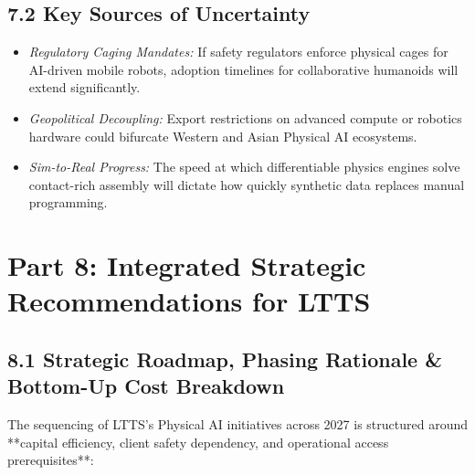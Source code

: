 \documentclass[11pt,a4paper]{article}
\begin{document}
\subsection{7.2 Key Sources of Uncertainty}
\begin{itemize}
    \item \textit{Regulatory Caging Mandates:} If safety regulators enforce physical cages for AI-driven mobile robots, adoption timelines for collaborative humanoids will extend significantly.
    \item \textit{Geopolitical Decoupling:} Export restrictions on advanced compute or robotics hardware could bifurcate Western and Asian Physical AI ecosystems.
    \item \textit{Sim-to-Real Progress:} The speed at which differentiable physics engines solve contact-rich assembly will dictate how quickly synthetic data replaces manual programming.
\end{itemize}

\section{Part 8: Integrated Strategic Recommendations for LTTS}

\subsection{8.1 Strategic Roadmap, Phasing Rationale \& Bottom-Up Cost Breakdown}
The sequencing of LTTS's Physical AI initiatives across 2027 is structured around **capital efficiency, client safety dependency, and operational access prerequisites**:
\end{document}
